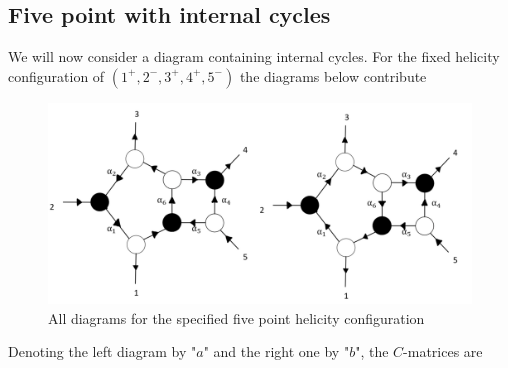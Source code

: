 \documentclass[letter,11pt]{article}
\begin{document}
\subsection{Five point with internal cycles}
We will now consider a diagram containing internal cycles. For the fixed helicity configuration of $(1^+,2^-,3^+,4^+,5^-)$ the diagrams below contribute
\begin{figure}[H]
	\centering
	\includegraphics[width=0.7\linewidth]{5pt3}
	\caption{All diagrams for the specified five point helicity configuration}
	\label{fig:5pt}
\end{figure}
Denoting the left diagram by "$a$" and the right one by "$b$", the $C$-matrices are
\end{document}

